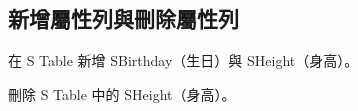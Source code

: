 \documentclass[12pt, a4paper]{report}
\begin{document}
\subsection{新增屬性列與刪除屬性列}

在 S Table 新增 SBirthday（生日）與 SHeight（身高）。

\begin{figure}[H] %
    \centering %
\end{figure}

刪除 S Table 中的 SHeight（身高）。

\begin{figure}[H] %
    \centering %
\end{figure}
\end{document}
